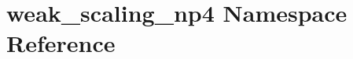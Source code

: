 \hypertarget{namespaceweak__scaling__np4}{}\section{weak\+\_\+scaling\+\_\+np4 Namespace Reference}
\label{namespaceweak__scaling__np4}
